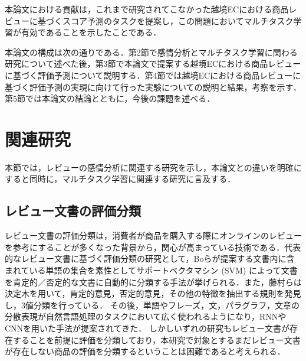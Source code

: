 \documentclass[dvipdfmx,twocolumn,10.5pt]{jsarticle}
\begin{document}
本論文における貢献は，これまで研究されてこなかった越境ECにおける商品レビューに基づくスコア予測のタスクを提案し，この問題においてマルチタスク学習が有効であることを示したことである．

本論文の構成は次の通りである．第2節で感情分析とマルチタスク学習に関わる研究について述べた後，第3節で本論文で提案する越境ECにおける商品レビューに基づく評価予測について説明する．第4節では越境ECにおける商品レビューに基づく評価予測の実現に向けて行った実験についての説明と結果，考察を示す．第5節では本論文の結論とともに，今後の課題を述べる．

\section{関連研究}\label{related-works}
本節では，レビューの感情分析に関連する研究を示し，本論文との違いを明確にすると同時に，マルチタスク学習に関連する研究に言及する．


\subsection{レビュー文書の評価分類}\label{sentiment_analysis}
レビュー文書の評価分類は，消費者が商品を購入する際にオンラインのレビューを参考にすることが多くなった背景から，関心が高まっている技術である．代表的なレビュー文書に基づく評価分類の研究として，Boらが提案する文書内に含まれている単語の集合を素性としてサポートベクタマシン (SVM) によって文書を肯定的／否定的な文書に自動的に分類する手法が挙げられる．\cite{pang2002thumbs}また，藤村らは決定木を用いて，肯定的意見，否定的意見，その他の特徴を抽出する規則を発見し，3値分類を行っている．\cite{dunning1993accurate}
その後，単語やフレーズ，文，パラグラフ，文章の分散表現が自然言語処理のタスクにおいて広く使われるようになり，RNNやCNNを用いた手法が提案されてきた．\cite{liu2015multi}\cite{kalchbrenner2014convolutional}\cite{le2014distributed}\cite{socher2013recursive}
しかしいずれの研究もレビュー文書が存在することを前提に評価を分類しており，本研究で対象とするまだレビュー文書が存在しない商品の評価を分類するということは困難であると考えられる．
\end{document}
